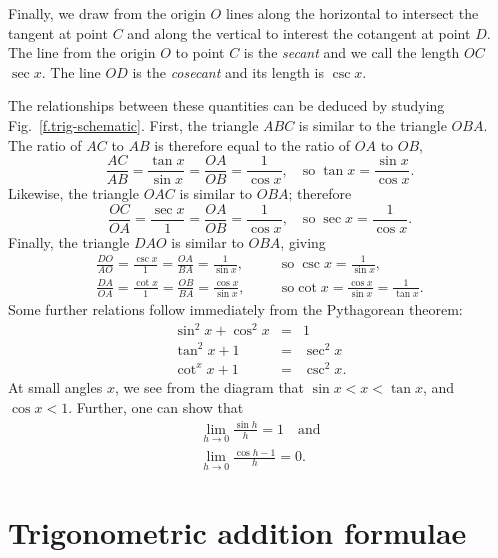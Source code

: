 Finally, we draw from the origin $O$ lines along the horizontal to intersect the tangent at point $C$ and along the vertical to interest the cotangent at point $D$.  
The line from the origin $O$ to point $C$ is the \emph{secant} and we call the length $OC$ $\sec x$. The line $OD$ is the \emph{cosecant} and its length is $\csc x$.

The relationships between these quantities can be deduced by studying Fig.~\ref{f.trig-schematic}.  First, the triangle $ABC$ is similar to the triangle $OBA$. The ratio of $AC$ to $AB$ is therefore equal to the ratio of $OA$ to $OB$,
\begin{equation}\label{e.tan}
	\frac{AC}{AB} = \frac{\tan x}{\sin x} = \frac{OA}{OB} = \frac{1}{\cos x},\quad\textrm{so}
	\;\tan x = \frac{\sin x}{\cos x}.
\end{equation}
Likewise, the triangle $OAC$ is similar to $OBA$; therefore
\begin{equation}\label{e.sec}
	\frac{OC}{OA} = \frac{\sec x}{1} = \frac{OA}{OB} = \frac{1}{\cos x},\quad\textrm{so}
	\;\sec x = \frac{1}{\cos x}.
\end{equation}
Finally, the triangle $DAO$ is similar to $OBA$, giving
\begin{eqnarray}
	\frac{DO} {AO} = \frac{\csc x}{1} = \frac{OA}{BA} = \frac{1}{\sin x},&\quad&\textrm{so}
	\;\csc x = \frac{1}{\sin x},\label{e.csc}\\
	\frac{DA}{OA} = \frac{\cot x}{1} =  \frac{OB}{BA} = \frac{\cos x}{\sin x},&\quad&\textrm{so}
	\cot x = \frac{\cos x}{\sin x} = \frac{1}{\tan x}.\label{e.cot}
\end{eqnarray}
Some further relations follow immediately from the Pythagorean theorem:
\begin{eqnarray*}
	\sin^{2} x + \cos^{2} x &=& 1 \\
	\tan^{2} x + 1 &=& \sec^{2} x \\
	\cot^{x} x + 1 &=& \csc^{2} x.
\end{eqnarray*}
At small angles $x$, we see from the diagram that
$ \sin x < x < \tan x$, and $\cos x < 1$.
Further, one can show\cite{Courant1996What-is-Mathema} that
\begin{eqnarray}
	\lim_{h\to 0}\frac{\sin h}{h} = 1\quad\textrm{and}\label{e.lim-sine}\\
	\lim_{h\to 0}\frac{\cos h -1}{h} = 0.\label{e.lim-cosine}
\end{eqnarray}

\section{Trigonometric addition formulae}

